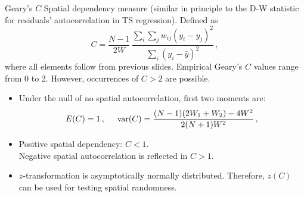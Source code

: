 \documentclass{beamer}
\begin{document}
\begin{frame}{Geary's $C$}
 Spatial dependency measure (similar in principle to the D-W statistic for residuals' autocorrelation in TS regression). Defined as
 \begin{equation*}
C = \frac{N-1}{2W}\,
    \frac{\sum_{i}\sum_{j}w_{ij}(y_i-y_j)^2}
         {\sum_{i}(y_i-\bar{y})^2} \,,
\end{equation*}   
where all elements follow from previous slides. Empirical Geary's $C$ values range from 0 to 2. However, occurrences of $C>2$ are possible.\\
\smallskip
\begin{itemize}
    \item Under the null of no spatial autocorrelation, first two moments are:
\begin{equation*}
E(C) = 1\, ,\hspace{0.5cm}
\textnormal{var}(C) = \frac{(N-1)(2W_1 + W_2) - 4W^2 }{2(N+1)W^2} \,,
\end{equation*}  
\item Positive spatial dependency: $C < 1$.\\ Negative spatial autocorrelation is reflected in $C > 1$.
\smallskip
\item $z$-transformation is asymptotically normally distributed. Therefore, $z(C)$ can be used for testing spatial randomness.
\end{itemize}
\end{frame}
\end{document}
